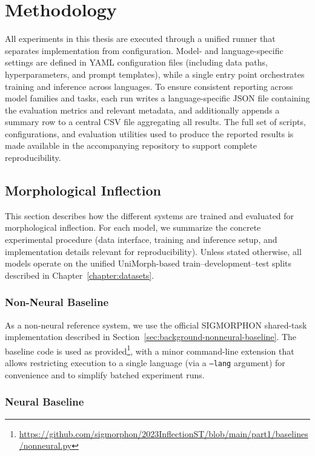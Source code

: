 \chapter{Methodology}\label{chapter:methodology}

All experiments in this thesis are executed through a unified runner that separates implementation from configuration. Model- and language-specific settings are defined in YAML configuration files (including data paths, hyperparameters, and prompt templates), while a single entry point orchestrates training and inference across languages. To ensure consistent reporting across model families and tasks, each run writes a language-specific JSON file containing the evaluation metrics and relevant metadata, and additionally appends a summary row to a central CSV file aggregating all results. The full set of scripts, configurations, and evaluation utilities used to produce the reported results is made available in the accompanying repository to support complete reproducibility.

\section{Morphological Inflection}

This section describes how the different systems are trained and evaluated for morphological inflection. For each model, we summarize the concrete experimental procedure (data interface, training and inference setup, and implementation details relevant for reproducibility). Unless stated otherwise, all models operate on the unified UniMorph-based train--development--test splits described in Chapter~\ref{chapter:datasets}.

\subsection{Non-Neural Baseline}

As a non-neural reference system, we use the official SIGMORPHON shared-task implementation \parencite{goldman-etal-2023-sigmorphon} described in Section~\ref{sec:background-nonneural-baseline}. The baseline code is used as provided\footnote{\url{https://github.com/sigmorphon/2023InflectionST/blob/main/part1/baselines/nonneural.py}}, with a minor command-line extension that allows restricting execution to a single language (via a \texttt{--lang} argument) for convenience and to simplify batched experiment runs.

\subsection{Neural Baseline}


